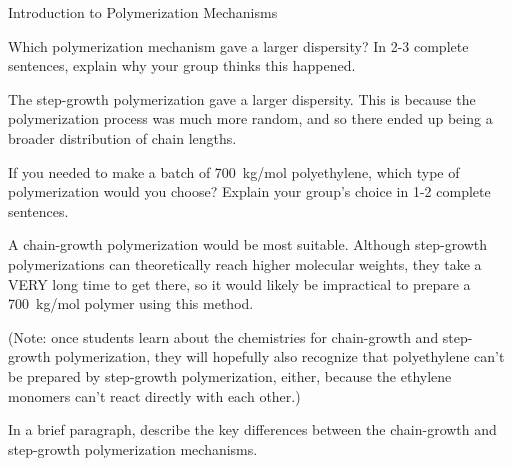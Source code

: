 \begin{activity}{Introduction to Polymerization Mechanisms}
\begin{ctqs}
	\question Which polymerization mechanism gave a larger dispersity?  In 2-3 complete sentences, explain why your group thinks this happened.
	
		\begin{solution}[1.75in]
			The step-growth polymerization gave a larger dispersity.  This is because the polymerization process was much more random, and so there ended up being a broader distribution of chain lengths.
		\end{solution}
	
	\question If you needed to make a batch of 700~kg/mol polyethylene, which type of polymerization would you choose?  Explain your group's choice in 1-2 complete sentences.
	
		\begin{solution}[1.75in]
			A chain-growth polymerization would be most suitable.  Although step-growth polymerizations can theoretically reach higher molecular weights, they take a VERY long time to get there, so it would likely be impractical to prepare a 700~kg/mol polymer using this method.
			
			(Note: once students learn about the chemistries for chain-growth and step-growth polymerization, they will hopefully also recognize that polyethylene can't be prepared by step-growth polymerization, either, because the ethylene monomers can't react directly with each other.)
		\end{solution}
	
\end{ctqs}

\clearpage
\begin{exercises}

		\exercise In a brief paragraph, describe the key differences between the chain-growth and step-growth polymerization mechanisms.
		
		\begin{solution}\end{solution}
		

\end{exercises}
\end{activity}
